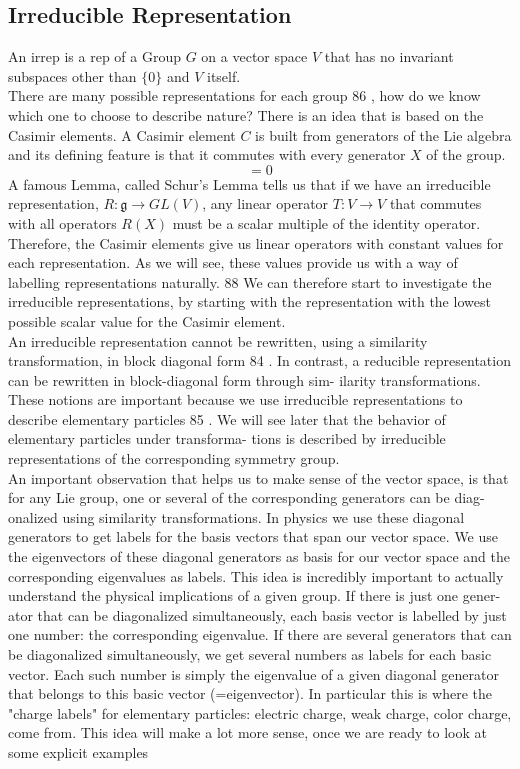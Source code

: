 \subsection{Irreducible Representation}
An irrep  is a rep of a Group $G$ on a vector space $V$ that has no invariant subspaces other than $\{ 0 \}$ and $V$ itself.\\
There are many possible representations for each group 86 , how do
we know which one to choose to describe nature? There is an idea
that is based on the Casimir elements. A Casimir element $C$ is built
from generators of the Lie algebra and its defining feature is that it
commutes with every generator $X$ of the group.
\begin{equation}
	[C, X ] = 0
\end{equation}
A famous Lemma, called Schur’s Lemma tells us that if we have an irreducible representation,
$R: \mathfrak{g} \rightarrow GL(V)$, any linear operator $T: V \rightarrow V$ that commutes with all operators $R(X)$ must be a scalar multiple of the identity operator. Therefore,
the Casimir elements give us linear operators with constant values for each representation. As we will see, these values provide us with
a way of labelling representations naturally. 88 We can therefore start
to investigate the irreducible representations, by starting with the
representation with the lowest possible scalar value for the Casimir
element.\\

An irreducible representation cannot be rewritten, using a similarity
transformation, in block diagonal form 84 . In contrast, a reducible
representation can be rewritten in block-diagonal form through sim-
ilarity transformations. These notions are important because we use
irreducible representations to describe elementary particles 85 . We will
see later that the behavior of elementary particles under transforma-
tions is described by irreducible representations of the corresponding
symmetry group.\\
 An important observation
that helps us to make sense of the vector space, is that for any Lie
group, one or several of the corresponding generators can be diag-
onalized using similarity transformations. In physics we use these
diagonal generators to get labels for the basis vectors that span our
vector space. We use the eigenvectors of these diagonal generators
as basis for our vector space and the corresponding eigenvalues as
labels. This idea is incredibly important to actually understand the
physical implications of a given group. If there is just one gener-
ator that can be diagonalized simultaneously, each basis vector is
labelled by just one number: the corresponding eigenvalue. If there
are several generators that can be diagonalized simultaneously, we
get several numbers as labels for each basic vector. Each such number
is simply the eigenvalue of a given diagonal generator that belongs
to this basic vector (=eigenvector). In particular this is where the
"charge labels" for elementary particles: electric charge, weak charge,
color charge, come from. This idea will make a lot more sense, once
we are ready to look at some explicit examples

